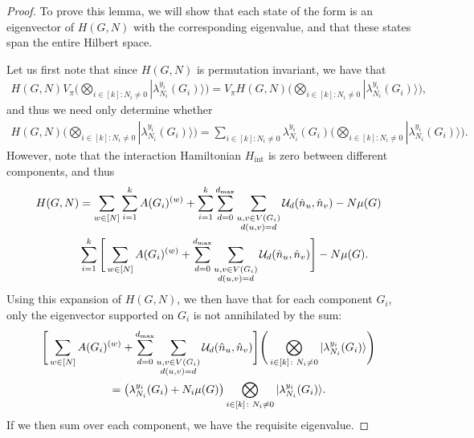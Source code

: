 \documentclass[../thesis-main/thesis-main]{subfiles}
\begin{document}
\begin{proof}
To prove this lemma, we will show that each state of the form  is an eigenvector of $H(G,N)$ with the corresponding eigenvalue, and that these states span the entire Hilbert space.

Let us first note that since $H(G,N)$ is permutation invariant, we have that
\begin{align}
  H(G,N) V_\pi\Bigg(\bigotimes_{i\in[k]\colon N_{i}\neq0}|\lambda_{N_{i}}^{y_{i}}(G_{i})\rangle\Bigg) = V_\pi H(G,N)\Bigg(\bigotimes_{i\in[k]\colon N_{i}\neq0}|\lambda_{N_{i}}^{y_{i}}(G_{i})\rangle\Bigg),
\end{align}
and thus we need only determine whether
\begin{align}
  H(G,N) \Bigg(\bigotimes_{i\in[k]\colon N_{i}\neq0}|\lambda_{N_{i}}^{y_{i}}(G_{i})\rangle\Bigg) = \sum_{i\in[k]\colon N_{i}\neq0}\lambda_{N_{i}}^{y_{i}}(G_{i})\Bigg(\bigotimes_{i\in[k]\colon N_{i}\neq0}|\lambda_{N_{i}}^{y_{i}}(G_{i})\rangle\Bigg).
\end{align}
However, note that the interaction Hamiltonian $H_\text{int}$ is zero between different components, and thus
\begin{align}
H(G,N) &= \sum_{w\in[N]} \sum_{i=1}^k A(G_i)^{(w)} + \sum_{i=1}^k \sum_{d=0}^{d_{\text{max}}} \sum_{\substack{u,v\in V(G_i)\\d(u,v) = d}} \mathcal{U}_d(\hat{n}_u,\hat{n}_v) - N\mu(G)\\
  & \sum_{i=1}^k \Bigg[\sum_{w\in[N]}A(G_i)^{(w)} + \sum_{d=0}^{d_{\text{max}}} \sum_{\substack{u,v\in V(G_i)\\d(u,v) = d}} \mathcal{U}_d(\hat{n}_u,\hat{n}_v)\Bigg] - N \mu(G).
\end{align}
Using this expansion of $H(G,N)$, we then have that for each component $G_i$, only the eigenvector supported on $G_i$ is not annihilated by the sum:
\begin{align}
  &\Bigg[\sum_{w\in[N]}A(G_i)^{(w)} + \sum_{d=0}^{d_{\text{max}}} \sum_{\substack{u,v\in V(G_i)\\d(u,v) = d}} \mathcal{U}_d(\hat{n}_u,\hat{n}_v)\Bigg]   \Bigg(\bigotimes_{i\in[k]\colon N_{i}\neq0}|\lambda_{N_{i}}^{y_{i}}(G_{i})\rangle\Bigg) \nonumber\\
  &\qquad\qquad\qquad= \big(\lambda_{N_i}^{y_i}(G_i) + N_i \mu(G)\big) \bigotimes_{i\in[k]\colon N_{i}\neq0}|\lambda_{N_{i}}^{y_{i}}(G_{i})\rangle.
\end{align}
If we then sum over each component, we have the requisite eigenvalue.


\end{proof}
\end{document}

